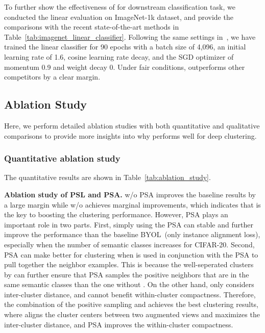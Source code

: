 To further show the effectiveness of \methodname for downstream classification task, we conducted the linear evaluation on ImageNet-1k dataset, and provide the comparisons with the recent state-of-the-art methods in Table~\ref{tab:imagenet_linear_classifier}. Following the same settings in~\cite{chen2021exploring}, we have trained the linear classifier for 90 epochs with a batch size of 4,096, an initial learning rate of 1.6, cosine learning rate decay, and the SGD optimizer of momentum 0.9 and weight decay 0. Under fair conditions, \methodname outperforms other competitors by a clear margin.

\subsection{Ablation Study}
\label{sec:ablation_study}
Here, we perform detailed ablation studies with both quantitative and qualitative comparisons to provide more insights into why \methodname performs well for deep clustering.



\subsubsection{Quantitative ablation study} 

The quantitative results are shown in Table~\ref{tab:ablation_study}.

\noindent\textbf{Ablation study of PSL and PSA.}\quad
\methodname w/o PSA improves the baseline results by a large margin while \methodname w/o \lossname achieves marginal improvements, which indicates that \lossname is the key to boosting the clustering performance. However, PSA plays an important role in two parts. First, simply using the PSA can stable and further improve the performance than the baseline BYOL~(only instance alignment loss), especially when the number of semantic classes increases for CIFAR-20. Second, PSA can make \methodname better for clustering when \lossname is used in conjunction with the PSA to pull together the neighbor examples. This is because the well-seperated clusters by \lossname can further ensure that PSA samples the positive neighbors that are in the same semantic classes than the one without \lossname.
On the other hand, \lossname only considers inter-cluster distance, and cannot benefit within-cluster compactness. Therefore, the combination of the positive sampling and \lossname achieves the best clustering results, where \lossname aligns the cluster centers between two augmented views and maximizes the inter-cluster distance, and PSA improves the within-cluster compactness.

